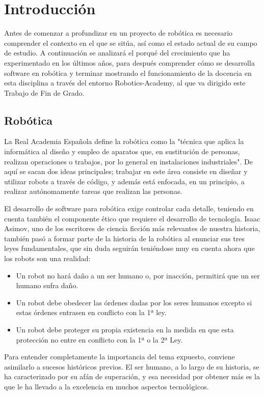 \documentclass[12pt,spanish,chapterprefix, numbers=noenddot]{book}
\numberwithin{equation}{section}
\numberwithin{figure}{section}
\begin{document}
\tableofcontents{}

\mainmatter

\chapter{Introducción}
Antes de comenzar a profundizar en un proyecto de robótica es necesario comprender el contexto en el que se sitúa, así como el estado actual de su campo de estudio. A continuación se analizará el porqué del crecimiento que ha experimentado en los últimos años, para después comprender cómo se desarrolla software en robótica y terminar mostrando el funcionamiento de la docencia en esta disciplina a través del entorno Robotics-Academy, al que va dirigido este Trabajo de Fin de Grado. 

\section{Robótica}
La Real Academia Española define la robótica como la "técnica que aplica la informática al diseño y empleo de aparatos que, en sustitución de personas, realizan operaciones o trabajos, por lo general en instalaciones industriales". De aquí se sacan dos ideas principales; trabajar en este área consiste en diseñar y utilizar robots a través de código, y además está enfocada, en un principio, a realizar autónomamente tareas que realizan las personas.

El desarrollo de software para robótica exige controlar cada detalle, teniendo en cuenta también el componente ético que requiere el desarrollo de tecnología. Isaac Asimov, uno de los escritores de ciencia ficción más relevantes de nuestra historia, también pasó a formar parte de la historia de la robótica al enunciar sus tres leyes fundamentales, que sin duda seguirán teniéndose muy en cuenta ahora que los robots son una realidad:
\begin{itemize}
    \item Un robot no hará daño a un ser humano o, por inacción, permitirá que un ser humano sufra daño.
    \item Un robot debe obedecer las órdenes dadas por los seres humanos excepto si estas órdenes entrasen en conflicto con la 1ª ley.
    \item Un robot debe proteger su propia existencia en la medida en que esta protección no entre en conflicto con la 1ª o la 2ª Ley.
\end{itemize}

Para entender completamente la importancia del tema expuesto, conviene asimilarlo a sucesos históricos previos. El ser humano, a lo largo de su historia, se ha caracterizado por su afán de superación, y esa necesidad por obtener más es la que le ha llevado a la excelencia en muchos aspectos tecnológicos. 
\end{document}
